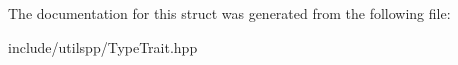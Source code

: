 The documentation for this struct was generated from the following file\-:\begin{DoxyCompactItemize}
\item 
include/utilspp/Type\-Trait.\-hpp\end{DoxyCompactItemize}

